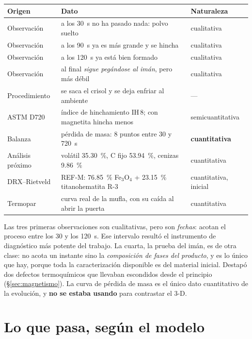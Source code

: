\documentclass[11pt,a4paper]{article}
\newcommand{\ojo}[1]{\textcolor{aviso}{\textbf{#1}}}
\begin{document}
\begin{table}[H]
\centering
\small
\begin{tabular}{lll}
\toprule
\textbf{Origen} & \textbf{Dato} & \textbf{Naturaleza} \\
\midrule
Observación & a los \SI{30}{\second} no ha pasado nada: polvo suelto & cualitativa \\
Observación & a los \SI{90}{\second} ya es más grande y se hincha & cualitativa \\
Observación & a los \SI{120}{\second} ya está bien formado & cualitativa \\
Observación & al final \emph{sigue pegándose al imán}, pero más débil & cualitativa \\
Procedimiento & se saca el crisol y se deja enfriar al ambiente & --- \\
ASTM D720 & índice de hinchamiento IH\,8; con magnetita hincha menos & semicuantitativa \\
Balanza & pérdida de masa: 8 puntos entre 30 y \SI{720}{\second} & \textbf{cuantitativa} \\
Análisis próximo & volátil \qty{35.30}{\percent}, C fijo \qty{53.94}{\percent}, cenizas \qty{9.86}{\percent} & cuantitativa \\
DRX--Rietveld & REF-M: \qty{76.85}{\percent} Fe$_3$O$_4$ + \qty{23.15}{\percent} titanohematita R-3 & cuantitativa, inicial \\
Termopar & curva real de la mufla, con su caída al abrir la puerta & cuantitativa \\
\bottomrule
\end{tabular}
\end{table}

Las tres primeras observaciones son cualitativas, pero son \emph{fechas}: acotan
el proceso entre los 30 y los \SI{120}{\second}. Ese intervalo resultó el
instrumento de diagnóstico más potente del trabajo. La cuarta, la prueba del
imán, es de otra clase: no acota un instante sino la \emph{composición de fases
del producto}, y es lo único que hay, porque toda la caracterización disponible
es del material inicial. Destapó dos defectos termoquímicos que llevaban
escondidos desde el principio (\S\ref{sec:magnetismo}). La curva de pérdida de masa es el único dato
cuantitativo de la evolución, y \ojo{no se estaba usando} para contrastar el 3-D.



\section{Lo que pasa, según el modelo}
\end{document}
